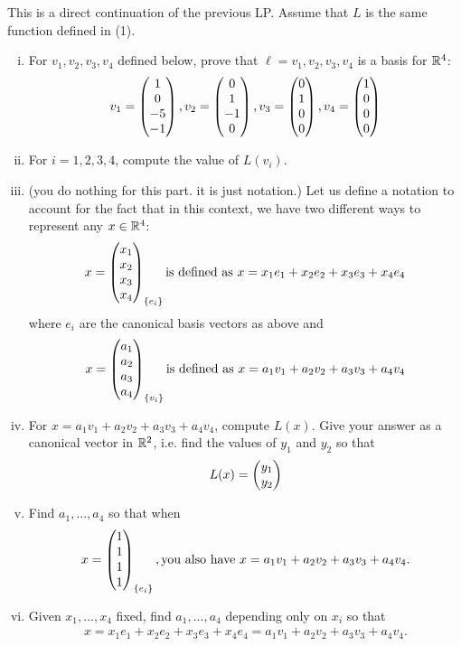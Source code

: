 \begin{question}
    \normalfont
    This is a direct continuation of the previous LP. Assume that $L$ is the same function defined in (1).
    \begin{enumerate}[(i)]
        \item For $v_1,v_2,v_3,v_4$ defined below, prove that $\ell={v_1,v_2,v_3,v_4}$ is a basis for $\mathbb R^4$:
        \begin{equation}
            v_1=\begin{pmatrix} 1\\ 0\\-5 \\ -1\end{pmatrix}, v_2=\begin{pmatrix} 0\\ 1\\-1 \\ 0\end{pmatrix}, v_3=\begin{pmatrix} 0\\ 1\\0 \\ 0\end{pmatrix}, v_4=\begin{pmatrix} 1\\ 0\\0 \\ 0\end{pmatrix}
        \end{equation}
        \item For $i=1,2,3,4$, compute the value of $L(v_i)$.
        \item (you do nothing for this part. it is just notation.) Let us define a notation to account for the fact that in this context, we have two different ways to represent any $x\in\mathbb R^4$: 
        \[
            \begin{aligned}
                x=\begin{pmatrix} x_1\\ x_2\\x_3 \\ x_4\end{pmatrix}_{\{e_i\}} \text{is defined as } x=x_1e_1+x_2e_2+x_3e_3+x_4e_4
            \end{aligned}
        \]
        where ${e_i}$ are the canonical basis vectors as above and 
        \[
            \begin{aligned}
                x=\begin{pmatrix} a_1\\ a_2\\a_3 \\ a_4\end{pmatrix}_{\{v_i\}} \text{is defined as } x=a_1v_1+a_2v_2+a_3v_3+a_4v_4
            \end{aligned}
        \]
        \item For $x=a_1v_1+a_2v_2+a_3v_3+a_4v_4$, compute $L(x)$. Give your answer as a canonical vector in $\mathbb R^2$, i.e. find the values of $y_1$ and $y_2$ so that 
        \[
            \begin{aligned}
                L(x)=\begin{pmatrix} y_1\\ y_2\end{pmatrix}
            \end{aligned}
        \]
        \item Find $a_1,...,a_4$ so that when 
        \[
            \begin{aligned}
                x=\begin{pmatrix} 1\\ 1\\1 \\ 1\end{pmatrix}_{\{e_i\}}, \text{you also have } x=a_1v_1+a_2v_2+a_3v_3+a_4v_4.
            \end{aligned}
        \]
        \item Given $x_1,...,x_4$ fixed, find $a_1,...,a_4$ depending only on $x_i$ so that 
        \[
            \begin{aligned}
                x=x_1e_1+x_2e_2+x_3e_3+x_4e_4=a_1v_1+a_2v_2+a_3v_3+a_4v_4.

\end{aligned}\]
\end{enumerate}
\end{question}
